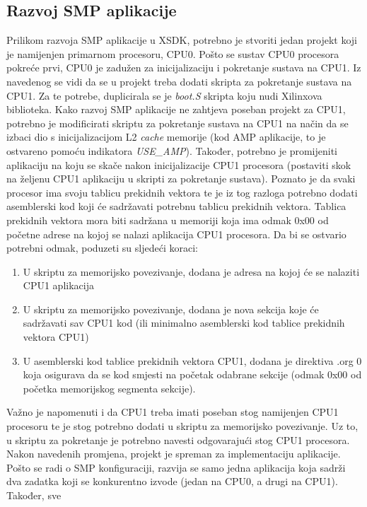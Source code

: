 \documentclass[times, utf8, diplomski, numeric]{fer}
\begin{document}
\subsection{Razvoj SMP aplikacije}
Prilikom razvoja SMP aplikacije u XSDK, potrebno je stvoriti jedan projekt koji je namijenjen primarnom procesoru, CPU0.
Pošto se sustav CPU0 procesora pokreće prvi, CPU0 je zadužen za inicijalizaciju i pokretanje sustava na CPU1. Iz navedenog
se vidi da se u projekt treba dodati skripta za pokretanje sustava na CPU1. Za te potrebe, duplicirala se je \textit{boot.S} skripta
koju nudi Xilinxova biblioteka. Kako razvoj SMP aplikacije ne zahtjeva poseban projekt za CPU1, potrebno je modificirati
skriptu za pokretanje sustava na CPU1 na način da se izbaci dio s inicijalizacijom L2 \textit{cache} memorije (kod AMP
aplikacije, to je ostvareno pomoću indikatora \textit{USE\_AMP}). Također, potrebno je promijeniti aplikaciju na koju se skače
nakon inicijalizacije CPU1 procesora (postaviti skok na željenu CPU1 aplikaciju u skripti za pokretanje sustava).
Poznato je da svaki procesor ima svoju tablicu
prekidnih vektora te je iz tog razloga potrebno dodati asemblerski kod koji će sadržavati potrebnu tablicu prekidnih vektora.
Tablica prekidnih vektora mora biti sadržana u memoriji koja ima odmak 0x00 od početne adrese na kojoj se nalazi
aplikacija CPU1 procesora. Da bi se ostvario potrebni odmak, poduzeti su sljedeći koraci:
\begin{enumerate}
  \item{U skriptu za memorijsko povezivanje, dodana je adresa na kojoj će se nalaziti CPU1 aplikacija}
  \item{U skriptu za memorijsko povezivanje, dodana je nova sekcija koje će sadržavati sav CPU1 kod (ili minimalno asemblerski
  kod tablice prekidnih vektora CPU1)}
  \item{U asemblerski kod tablice prekidnih vektora CPU1, dodana je direktiva .org 0 koja osigurava da se kod smjesti na
  početak odabrane sekcije (odmak 0x00 od početka memorijskog segmenta sekcije).}
\end{enumerate}
Važno je napomenuti i da CPU1 treba imati poseban stog namijenjen CPU1 procesoru te je stog potrebno dodati u skriptu za
memorijsko povezivanje. Uz to, u skriptu za pokretanje je potrebno navesti odgovarajući stog CPU1 procesora.
Nakon navedenih promjena, projekt je spreman za implementaciju aplikacije. Pošto se radi o SMP konfiguraciji, razvija se
samo jedna aplikacija koja sadrži dva zadatka koji se konkurentno izvode (jedan na CPU0, a drugi na CPU1). Također, sve
\end{document}
